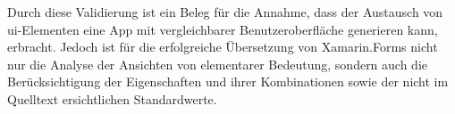 Durch diese Validierung ist ein Beleg für die Annahme,  dass der Austausch von \ac{ui}-Elementen eine App mit vergleichbarer Benutzeroberfläche generieren kann,  erbracht. Jedoch ist für die erfolgreiche Übersetzung von Xamarin.Forms nicht nur die Analyse der Ansichten von elementarer Bedeutung, sondern auch die Berücksichtigung der Eigenschaften und ihrer Kombinationen sowie der nicht im Quelltext ersichtlichen Standardwerte.


